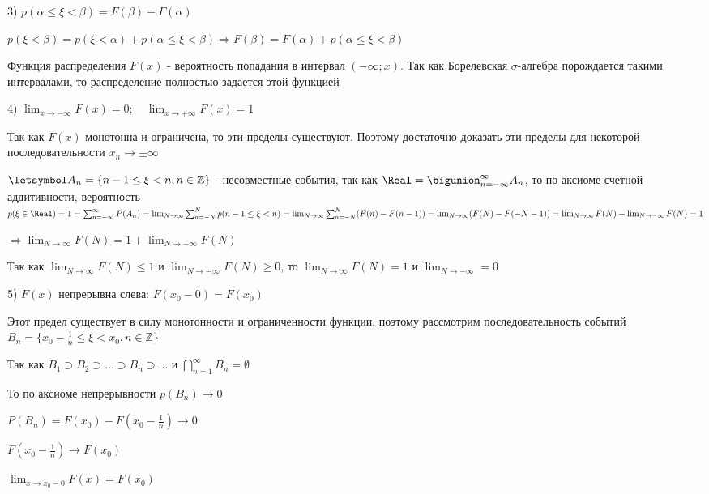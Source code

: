 \documentclass[12pt]{article}
\begin{document}
    3) $p(\alpha \leq \xi < \beta) = F(\beta) - F(\alpha)$

    \begin{MyProof}
        $p(\xi < \beta) = p(\xi < \alpha) + p(\alpha \leq \xi < \beta) \Longrightarrow F(\beta) = F(\alpha) + p(\alpha \leq \xi < \beta)$
    \end{MyProof}
    
    \Notas Функция распределения $F(x)$ - вероятность попадания в интервал $(-\infty; x)$. Так как Борелевская $\sigma$-алгебра порождается такими интервалами,
    то распределение полностью задается этой функцией

    4) $\lim_{x \to -\infty} F(x) = 0; \quad \lim_{x \to +\infty} F(x) = 1$

    \begin{MyProof}
        Так как $F(x)$ монотонна и ограничена, то эти пределы существуют. Поэтому достаточно доказать эти пределы для некоторой последовательности $x_n \to \pm \infty$

        $\letsymbol A_n = \{n - 1 \leq \xi < n, n \in \mathbb{Z}\}$ - несовместные события, так как $\Real = \bigunion_{n = -\infty}^\infty A_n$, то
        по аксиоме счетной аддитивности, вероятность $p(\xi \in \Real) = 1 = \sum_{n = -\infty}^\infty P(A_n) = \lim_{N \to \infty} \sum_{n = -N}^N p(n - 1 \leq \xi < n) = 
        \lim_{N \to \infty} \sum_{n = -N}^N (F(n) - F(n - 1)) = \lim_{N \to \infty} (F(N) - F(-N - 1)) = \lim_{N \to \infty} F(N) - \lim_{N \to -\infty} F(N) = 1$

        $\Longrightarrow \lim_{N \to \infty} F(N) = 1 + \lim_{N \to -\infty} F(N) $

        Так как $\lim_{N \to \infty} F(N) \leq 1$ и $\lim_{N \to -\infty} F(N) \geq 0$, то $\lim_{N \to \infty} F(N) = 1$ и $\lim_{N \to -\infty} = 0$
    \end{MyProof}
    
    5) $F(x)$ непрерывна слева: $F(x_0 - 0) = F(x_0)$

    \begin{MyProof}
        Этот предел существует в силу монотонности и ограниченности функции, поэтому рассмотрим последовательность событий $B_n = \{x_0 - \frac{1}{n} \leq \xi < x_0, n \in \mathbb{Z}\}$

        Так как $B_1 \supset B_2 \supset \dots \supset B_n \supset \dots$ и $\bigcap_{n = 1}^\infty B_n = \emptyset$

        То по аксиоме непрерывности $p(B_n) \to 0$

        $P(B_n) = F(x_0) - F(x_0 - \frac{1}{n}) \rightarrow 0$

        $F(x_0 - \frac{1}{n}) \to F(x_0)$

        $\lim_{x \to x_0 - 0} F(x) = F(x_0)$
    \end{MyProof}
    
\end{document}
